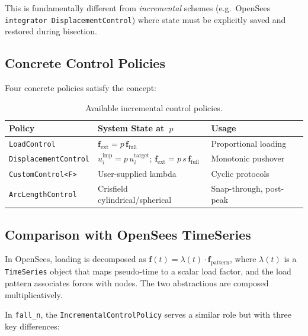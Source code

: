 This is fundamentally different from \emph{incremental} schemes
(e.g.~OpenSees \texttt{integrator DisplacementControl}) where state
must be explicitly saved and restored during bisection.

\subsection{Concrete Control Policies}
\label{ssec:control-policies}

Four concrete policies satisfy the concept:

\begin{table}[htbp]
\centering
\caption{Available incremental control policies.}
\label{tab:control-policies}
\begin{tabular}{@{}lll@{}}
\toprule
\textbf{Policy} & \textbf{System State at~$p$} & \textbf{Usage} \\
\midrule
\texttt{LoadControl}
  & $\mathbf{f}_{\text{ext}} = p\,\mathbf{f}_{\text{full}}$
  & Proportional loading \\
\texttt{DisplacementControl}
  & $u_i^{\text{imp}} = p\,u_i^{\text{target}}$;\;
    $\mathbf{f}_{\text{ext}} = p\,s\,\mathbf{f}_{\text{full}}$
  & Monotonic pushover \\
\texttt{CustomControl<F>}
  & User-supplied lambda
  & Cyclic protocols \\
\texttt{ArcLengthControl}
  & Crisfield cylindrical/spherical
  & Snap-through, post-peak \\
\bottomrule
\end{tabular}
\end{table}

\subsection{Comparison with OpenSees TimeSeries}
\label{ssec:timeseries-comparison}

In OpenSees, loading is decomposed as
$\mathbf{f}(t) = \lambda(t) \cdot \mathbf{f}_{\text{pattern}}$,
where $\lambda(t)$ is a \texttt{TimeSeries} object that maps pseudo-time
to a scalar load factor, and the load pattern associates forces with
nodes.  The two abstractions are composed multiplicatively.

In \texttt{fall\_n}, the \texttt{IncrementalControlPolicy} serves a
similar role but with three key differences:

